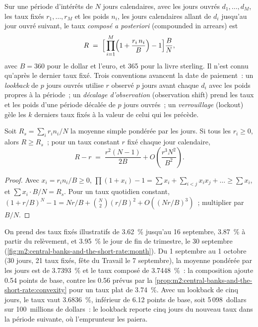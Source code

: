 \begin{definition}\label{def:m2:central-banks-and-the-short-rate:arrears}
Sur une période d'intérêts de $N$ jours calendaires, avec les jours ouvrés $d_1, \dots,
d_M$, les taux fixés $r_1, \dots, r_M$ et les poids $n_i$, les jours calendaires allant de
$d_i$ jusqu'au jour ouvré suivant, le taux \emph{composé a
posteriori} (compounded in arrears) est
\[
R \;=\; \Bigl[\,\prod_{i=1}^{M}\Bigl(1 + \frac{r_i\,n_i}{B}\Bigr) - 1\Bigr]\frac{B}{N},
\]
avec $B = 360$ pour le dollar et l'euro, et 365 pour la livre sterling. Il n'est connu
qu'après le dernier taux fixé. Trois conventions avancent la date de paiement~: un
\emph{lookback} de $p$ jours ouvrés utilise $r$ observé $p$ jours avant chaque $d_i$
avec les poids propres à la période~; un \emph{décalage d'observation} (observation shift) prend les taux et
les poids d'une période décalée de $p$ jours ouvrés~; un \emph{verrouillage} (lockout)
gèle les $k$ derniers taux fixés à la valeur de celui qui les précède.
\end{definition}

\begin{proposition}\label{prop:m2:central-banks-and-the-short-rate:convexity}
Soit $R_s = \sum_i r_i n_i / N$ la moyenne simple pondérée par les jours. Si tous les
$r_i \ge 0$, alors $R \ge R_s$~; pour un taux constant $r$ fixé chaque
jour calendaire,
\[
R - r \;=\; \frac{r^2 (N-1)}{2B} + O\!\left(\frac{r^3N^2}{B^2}\right).
\]
\end{proposition}
\begin{proof}
Avec $x_i = r_i n_i / B \ge 0$, $\prod (1 + x_i) - 1 = \sum x_i + \sum_{i<j}
x_i x_j + \dots \ge \sum x_i$, et $\sum x_i \cdot B/N = R_s$. Pour un taux
quotidien constant, $(1 + r/B)^N - 1 = Nr/B + \binom{N}{2}(r/B)^2 + O((Nr/B)^3)$~;
multiplier par $B/N$.
\end{proof}

\begin{example}\label{ex:m2:central-banks-and-the-short-rate:month}
On prend des taux fixés illustratifs de 3.62~\% jusqu'au 16 septembre, 3.87~\% à partir du
relèvement, et 3.95~\% le jour de fin de trimestre, le 30 septembre
(\cref{fig:m2:central-banks-and-the-short-rate:month}). Du 1 septembre au
1 octobre (30 jours, 21 taux fixés, fête du Travail le 7 septembre), la moyenne pondérée par les jours
est de 3.7393~\% et le taux composé de 3.7448~\%~: la composition ajoute 0.54 points
de base, contre les 0.56 prévus par la \cref{prop:m2:central-banks-and-the-short-rate:convexity}
pour un taux plat de 3.74~\%. Avec un lookback de cinq jours, le taux vaut 3.6836~\%, inférieur de 6.12 points
de base, soit 5\,098~dollars sur 100~millions de dollars~: le lookback reporte cinq jours
du nouveau taux dans la période suivante, où l'emprunteur les paiera.
\end{example}

